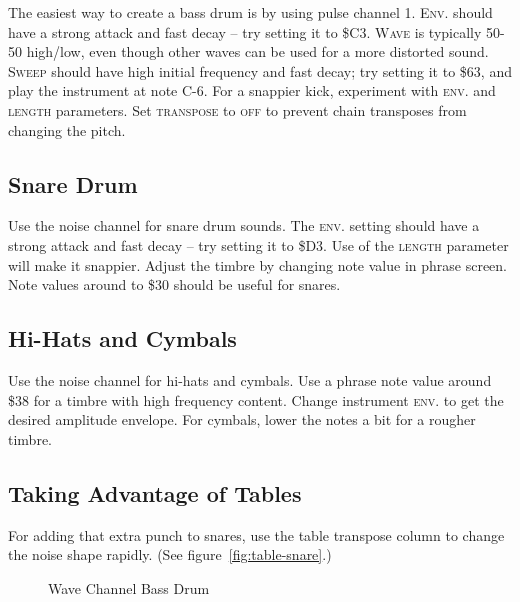 The easiest way to create a bass drum is by using pulse channel 1. \textsc{Env.} should have a strong attack and fast decay -- try setting it to \$C3. \textsc{Wave} is typically 50-50 high/low, even though other waves can be used for a more distorted sound. \textsc{Sweep} should have high initial frequency and fast decay; try setting it to \$63, and play the instrument at note C-6. For a snappier kick, experiment with \textsc{env.} and \textsc{length} parameters. Set \textsc{transpose} to \textsc{off} to prevent chain transposes from changing the pitch.

\subsection{Snare Drum}

Use the noise channel for snare drum sounds. The \textsc{env.} setting should have a strong attack and fast decay -- try setting it to \$D3. Use of the \textsc{length} parameter will make it snappier. Adjust the timbre by changing note value in phrase screen. Note values around to \$30 should be useful for snares.

\subsection{Hi-Hats and Cymbals}

Use the noise channel for hi-hats and cymbals. Use a phrase note value around \$38 for a timbre with high frequency content. Change instrument \textsc{env.} to get the desired amplitude envelope. For cymbals, lower the notes a bit for a rougher timbre.

\subsection{Taking Advantage of Tables}

For adding that extra punch to snares, use the table transpose column to change the noise shape rapidly. (See figure~\ref{fig:table-snare}.)

\begin{figure}[hbtp]
	\centering
	\qquad

	\qquad

	\caption{Wave Channel Bass Drum}
	\label{fig:wavekick}
\end{figure}

